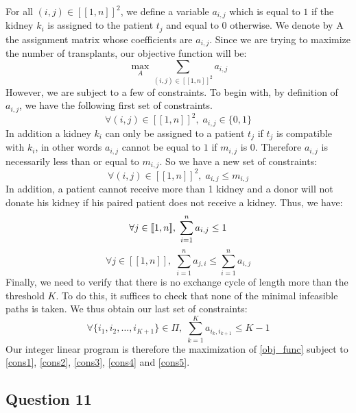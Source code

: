 \documentclass[english]{article}
\begin{document}
For all $(i, j) \in {[\![1, n]\!]}^2$, we define a variable $a_{i,j}$ which is equal to $1$ if the kidney $k_i$ is assigned to the patient $t_j$ and equal to $0$ otherwise. We denote by A the assignment matrix whose coefficients are $a_{i, j}$. Since we are trying to maximize the number of transplants, our objective function will be:
\begin{equation}\label{obj_func}
    \max_{A} \sum_{(i, j) \in {[\![1, n]\!]}^2} a_{i,j}
\end{equation}
However, we are subject to a few of constraints. To begin with, by definition of $a_{i, j}$, we have the following first set of constraints.
\begin{equation}\label{cons1}
    \forall (i, j) \in {[\![1, n]\!]}^2, \; a_{i,j} \in \{0, 1\}
\end{equation}
In addition a kidney $ k_i $ can only be assigned to a patient $ t_j $ if $ t_j $ is compatible with $ k_i $, in other words $ a_{i,j} $ cannot be equal to $1$ if $ m_{i,j} $ is $0$. Therefore $ a_{i,j} $ is necessarily less than or equal to $ m_{i,j} $. So we have a new set of constraints:
\begin{equation}\label{cons2}
    \forall (i, j) \in {[\![1, n]\!]}^2, \; a_{i,j} \leq m_{i,j}
\end{equation}
In addition, a patient cannot receive more than 1 kidney and a donor will not donate his kidney if his paired patient does not receive a kidney. Thus, we have:
\begin{equation}\label{cons3}
    \forall j \in [\![1, n]\!], \; \sum_{i = 1}^{n} a_{i,j} \leq 1\\
\end{equation}
\begin{equation}\label{cons4}
    \forall j \in [\![1, n]\!], \; \sum_{i = 1}^{n} a_{j,i} \leq \sum_{i = 1}^{n} a_{i,j}
\end{equation}
Finally, we need to verify that there is no exchange cycle of length more than the threshold $K$. To do this, it suffices to check that none of the minimal infeasible paths is taken. We thus obtain our last set of constraints:
\begin{equation}\label{cons5}
    \forall \{i_1, i_2, \dots, i_{K+1} \} \in \Pi, \; \sum_{k = 1}^{K} a_{i_k,i_{k+1}} \leq K - 1
\end{equation}
Our integer linear program is therefore the maximization of \ref{obj_func} subject to \ref{cons1}, \ref{cons2}, \ref{cons3}, \ref{cons4} and \ref{cons5}.

\subsection*{Question 11}
\end{document}
